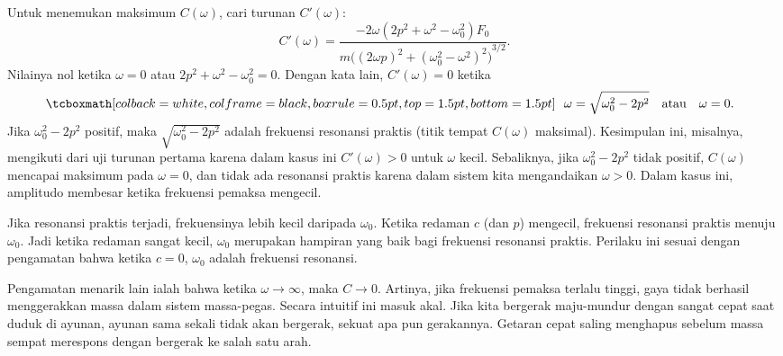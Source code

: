 \begin{myfig}
\capstart
{}
\caption{Grafik $C(\omega)$ yang menunjukkan resonansi praktis dengan parameter
$k=1$, $m=1$, $F_0 = 1$. Garis atas untuk $c=0.4$, garis tengah untuk
$c=0.8$, dan garis bawah untuk
$c=1.6$.\label{3.6:pracresfig}}
\end{myfig}

Untuk menemukan maksimum $C(\omega)$, cari turunan $C'(\omega)$:
\begin{equation*}
C'(\omega) =
\frac{- 2\omega( 2p^2+\omega^2-\omega_0^2)F_0}
{m {\bigl({(2\omega p)}^2+{(\omega_0^2-\omega^2)}^2\bigr)}^{3/2}} .
\end{equation*}
Nilainya nol ketika $\omega = 0$ atau $2p^2+\omega^2-\omega_0^2 = 0$. Dengan kata lain, $C'(\omega) = 0$ ketika
\begin{equation*}
\mybxbg{
~~
\omega = \sqrt{\omega_0^2 - 2p^2} \quad \text{atau} \quad \omega = 0 .
~~
}
\end{equation*}
Jika $\omega_0^2 - 2p^2$ positif, maka $\sqrt{\omega_0^2 - 2p^2}$ adalah frekuensi resonansi praktis (titik tempat $C(\omega)$ maksimal). Kesimpulan ini, misalnya, mengikuti dari uji turunan pertama karena dalam kasus ini $C'(\omega) > 0$ untuk $\omega$ kecil. Sebaliknya, jika $\omega_0^2 - 2p^2$ tidak positif, $C(\omega)$ mencapai maksimum pada $\omega=0$, dan tidak ada resonansi praktis karena dalam sistem kita mengandaikan $\omega > 0$. Dalam kasus ini, amplitudo membesar ketika frekuensi pemaksa mengecil.

Jika resonansi praktis terjadi, frekuensinya lebih kecil daripada $\omega_0$. Ketika redaman $c$ (dan $p$) mengecil, frekuensi resonansi praktis menuju $\omega_0$. Jadi ketika redaman sangat kecil, $\omega_0$ merupakan hampiran yang baik bagi frekuensi resonansi praktis. Perilaku ini sesuai dengan pengamatan bahwa ketika $c=0$, $\omega_0$ adalah frekuensi resonansi.

Pengamatan menarik lain ialah bahwa ketika $\omega \to \infty$, maka $C \to 0$. Artinya, jika frekuensi pemaksa terlalu tinggi, gaya tidak berhasil menggerakkan massa dalam sistem massa-pegas. Secara intuitif ini masuk akal. Jika kita bergerak maju-mundur dengan sangat cepat saat duduk di ayunan, ayunan sama sekali tidak akan bergerak, sekuat apa pun gerakannya. Getaran cepat saling menghapus sebelum massa sempat merespons dengan bergerak ke salah satu arah.

